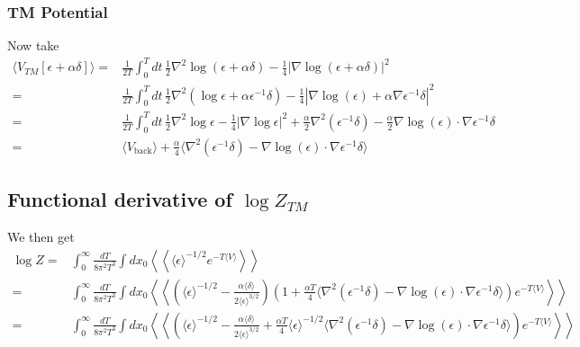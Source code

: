 \subsubsection{TM Potential}
Now take 
\begin{align}
\langle V_{TM}[\epsilon +\alpha\delta] \rangle =& \frac{1}{2T}\int_0^Tdt\,\frac{1}{2}\nabla^2\log(\epsilon+\alpha\delta)-\frac{1}{4}|\nabla\log(\epsilon+\alpha\delta)|^2\\
=& \frac{1}{2T}\int_0^Tdt\,\frac{1}{2}\nabla^2\left( \log\epsilon + \alpha\epsilon^{-1}\delta\right)-\frac{1}{4}|\nabla\log(\epsilon) +\alpha\nabla\epsilon^{-1}\delta|^2\\
=& \frac{1}{2T}\int_0^Tdt\,\frac{1}{2}\nabla^2\log\epsilon - \frac{1}{4}|\nabla\log\epsilon|^2 + \frac{\alpha}{2}\nabla^2(\epsilon^{-1}\delta)-\frac{\alpha}{2}\nabla\log(\epsilon)\cdot\nabla\epsilon^{-1}\delta\\
=& \langle V_{\text{back}}\rangle + \frac{\alpha}{4}\langle \nabla^2(\epsilon^{-1}\delta)- \nabla\log(\epsilon)\cdot\nabla\epsilon^{-1}\delta\rangle
\end{align}
\subsection{Functional derivative of $\log Z_{TM}$}
We then get
\begin{align}
\log Z =&\int_0^\infty \frac{dT}{8\pi^2T^3}\int dx_0\left<\left< \langle\epsilon\rangle^{-1/2}e^{- T\langle V\rangle}\right>\right>\\
=& \int_0^\infty \frac{dT}{8\pi^2T^3}\int dx_0\left<\left< \left(\langle\epsilon\rangle^{-1/2}-\frac{\alpha\langle\delta\rangle}{2\langle\epsilon\rangle^{3/2}}\right)\left( 1 + \frac{\alpha T}{4}\langle\nabla^2(\epsilon^{-1}\delta)-\nabla\log(\epsilon)\cdot\nabla\epsilon^{-1}\delta\rangle\right)e^{-T\langle V\rangle}\right>\right>\\
=& \int_0^\infty \frac{dT}{8\pi^2T^3}\int dx_0\left<\left< \left(\langle\epsilon\rangle^{-1/2}-\frac{\alpha\langle\delta\rangle}{2\langle\epsilon\rangle^{3/2}}  + \frac{\alpha T}{4}\langle\epsilon\rangle^{-1/2}\langle \nabla^2(\epsilon^{-1}\delta)-\nabla\log(\epsilon)\cdot\nabla\epsilon^{-1}\delta\rangle\right)e^{-T\langle V\rangle}\right>\right>
\end{align}

